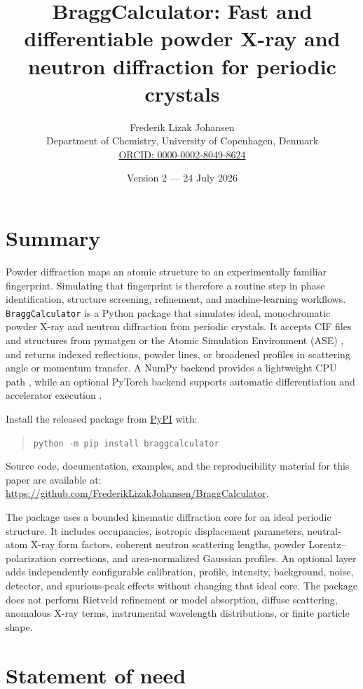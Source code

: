 \documentclass[10pt]{article}
\title{BraggCalculator: Fast and differentiable powder X-ray and neutron diffraction for periodic crystals}
\author{Frederik Lizak Johansen\\
\small Department of Chemistry, University of Copenhagen, Denmark\\
\small \href{https://orcid.org/0000-0002-8049-8624}{ORCID: 0000-0002-8049-8624}}
\date{Version 2 --- 24 July 2026}
\begin{document}
\maketitle

\section{Summary}

Powder diffraction maps an atomic structure to an experimentally familiar
fingerprint. Simulating that fingerprint is therefore a routine step in
phase identification, structure screening, refinement, and machine-learning
workflows. \texttt{BraggCalculator} \citep{braggcalculator2026} is a Python
package that simulates ideal, monochromatic powder X-ray and neutron
diffraction from periodic crystals. It accepts CIF files and structures from
pymatgen or the Atomic Simulation Environment (ASE) \citep{larsen2017}, and
returns indexed reflections, powder lines, or broadened profiles in scattering
angle or momentum transfer. A NumPy backend provides a lightweight CPU path
\citep{harris2020}, while an optional PyTorch backend supports automatic
differentiation and accelerator execution \citep{paszke2019}.

Install the released package from
\href{https://pypi.org/project/braggcalculator/}{PyPI} with:
\begin{quote}
\texttt{python -m pip install braggcalculator}
\end{quote}
Source code, documentation, examples, and the reproducibility material for
this paper are available at:
\url{https://github.com/FrederikLizakJohansen/BraggCalculator}.

The package uses a bounded kinematic diffraction core for an ideal periodic
structure. It includes occupancies, isotropic displacement
parameters, neutral-atom X-ray form factors, coherent neutron scattering
lengths, powder Lorentz--polarization corrections, and area-normalized Gaussian
profiles. An optional layer adds independently configurable calibration,
profile, intensity, background, noise, detector, and spurious-peak effects
without changing that ideal core. The package does not perform Rietveld
refinement or model absorption, diffuse scattering, anomalous X-ray terms,
instrumental wavelength distributions, or finite particle shape.

\section{Statement of need}
\end{document}
